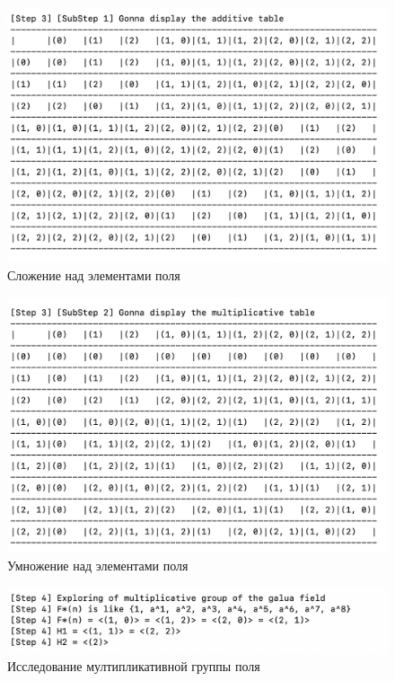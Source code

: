 \documentclass[a4paper]{article}
\begin{document}
\begin{figure}[H]
  \centering
  \includegraphics[width=\textwidth]{14_5}
  \caption{Сложение над элементами поля}
\end{figure}

\begin{figure}[H]
  \centering
  \includegraphics[width=\textwidth]{14_6}
  \caption{Умножение над элементами поля}
\end{figure}

\begin{figure}[H]
  \centering
  \includegraphics[width=\textwidth]{14_7}
  \caption{Исследование мултипликативной группы поля}
\end{figure}
\end{document}

